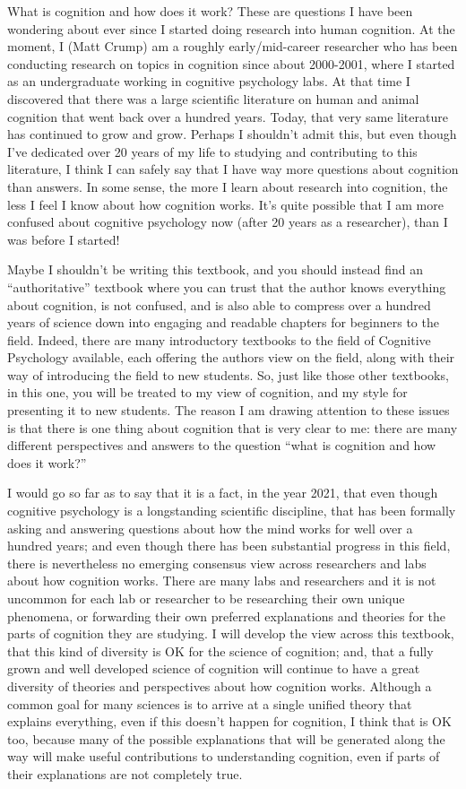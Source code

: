 \documentclass[
  oneside,
  12pt]{crumpbook}
\begin{document}
What is cognition and how does it work? These are questions I have been wondering about ever since I started doing research into human cognition. At the moment, I (Matt Crump) am a roughly early/mid-career researcher who has been conducting research on topics in cognition since about 2000-2001, where I started as an undergraduate working in cognitive psychology labs. At that time I discovered that there was a large scientific literature on human and animal cognition that went back over a hundred years. Today, that very same literature has continued to grow and grow. Perhaps I shouldn't admit this, but even though I've dedicated over 20 years of my life to studying and contributing to this literature, I think I can safely say that I have way more questions about cognition than answers. In some sense, the more I learn about research into cognition, the less I feel I know about how cognition works. It's quite possible that I am more confused about cognitive psychology now (after 20 years as a researcher), than I was before I started!

Maybe I shouldn't be writing this textbook, and you should instead find an ``authoritative'' textbook where you can trust that the author knows everything about cognition, is not confused, and is also able to compress over a hundred years of science down into engaging and readable chapters for beginners to the field. Indeed, there are many introductory textbooks to the field of Cognitive Psychology available, each offering the authors view on the field, along with their way of introducing the field to new students. So, just like those other textbooks, in this one, you will be treated to my view of cognition, and my style for presenting it to new students. The reason I am drawing attention to these issues is that there is one thing about cognition that is very clear to me: there are many different perspectives and answers to the question ``what is cognition and how does it work?''

I would go so far as to say that it is a fact, in the year 2021, that even though cognitive psychology is a longstanding scientific discipline, that has been formally asking and answering questions about how the mind works for well over a hundred years; and even though there has been substantial progress in this field, there is nevertheless no emerging consensus view across researchers and labs about how cognition works. There are many labs and researchers and it is not uncommon for each lab or researcher to be researching their own unique phenomena, or forwarding their own preferred explanations and theories for the parts of cognition they are studying. I will develop the view across this textbook, that this kind of diversity is OK for the science of cognition; and, that a fully grown and well developed science of cognition will continue to have a great diversity of theories and perspectives about how cognition works. Although a common goal for many sciences is to arrive at a single unified theory that explains everything, even if this doesn't happen for cognition, I think that is OK too, because many of the possible explanations that will be generated along the way will make useful contributions to understanding cognition, even if parts of their explanations are not completely true.
\end{document}
